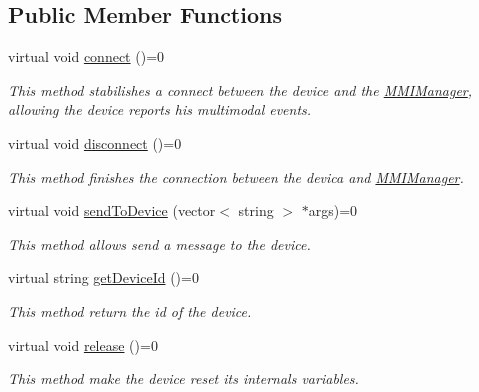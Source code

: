 \subsection*{Public Member Functions}
\begin{DoxyCompactItemize}
\item 
virtual void \hyperlink{classbr_1_1ufscar_1_1lince_1_1mmi_1_1IDeviceComm_a53f48993f294b9a755125b6ccdb06ad4}{connect} ()=0
\begin{DoxyCompactList}\small\item\em This method stabilishes a connect between the device and the \hyperlink{classbr_1_1ufscar_1_1lince_1_1mmi_1_1MMIManager}{MMIManager}, allowing the device reports his multimodal events. \item\end{DoxyCompactList}\item 
virtual void \hyperlink{classbr_1_1ufscar_1_1lince_1_1mmi_1_1IDeviceComm_ad3791cf1ab234f4a6b464c3f614c78c6}{disconnect} ()=0
\begin{DoxyCompactList}\small\item\em This method finishes the connection between the devica and \hyperlink{classbr_1_1ufscar_1_1lince_1_1mmi_1_1MMIManager}{MMIManager}. \item\end{DoxyCompactList}\item 
virtual void \hyperlink{classbr_1_1ufscar_1_1lince_1_1mmi_1_1IDeviceComm_a0249a13030b4df9b50778723421375d9}{sendToDevice} (vector$<$ string $>$ $\ast$args)=0
\begin{DoxyCompactList}\small\item\em This method allows send a message to the device. \item\end{DoxyCompactList}\item 
virtual string \hyperlink{classbr_1_1ufscar_1_1lince_1_1mmi_1_1IDeviceComm_a4ae69c19445713ddc9fda351555c1ac2}{getDeviceId} ()=0
\begin{DoxyCompactList}\small\item\em This method return the id of the device. \item\end{DoxyCompactList}\item 
virtual void \hyperlink{classbr_1_1ufscar_1_1lince_1_1mmi_1_1IDeviceComm_a9c173ebb83a502e78143a52fc7d87a80}{release} ()=0
\begin{DoxyCompactList}\small\item\em This method make the device reset its internals variables. \item\end{DoxyCompactList}\end{DoxyCompactItemize}
